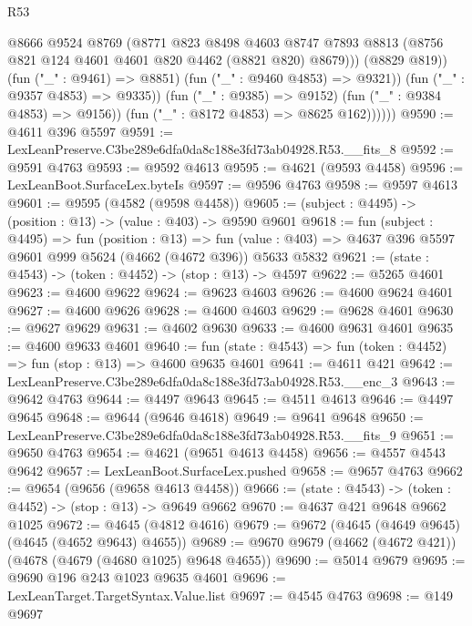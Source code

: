 \begin{lexlean}{R53}
\begin{coremodule}
                        @8666
                        @9524
                        @8769
                        (@8771
                          @823
                          @8498
                          @4603
                          @8747
                          @7893
                          @8813
                          (@8756 @821 @124 @4601 @4601 @820 @4462 (@8821 @820) @8679)))
                      (@8829 @819))
                    (fun ("_" : @9461) => @8851)
                    (fun ("_" : @9460 @4853) => @9321))
                  (fun ("_" : @9357 @4853) => @9335))
                (fun ("_" : @9385) => @9152)
                (fun ("_" : @9384 @4853) => @9156))
              (fun ("_" : @8172 @4853) => @8625 @162))))))
@9590 := @4611 @396 @5597
@9591 := LexLeanPreserve.C3be289e6dfa0da8c188e3fd73ab04928.R53.__fits_8
@9592 := @9591 @4763
@9593 := @9592 @4613
@9595 := @4621 (@9593 @4458)
@9596 := LexLeanBoot.SurfaceLex.byteIs
@9597 := @9596 @4763
@9598 := @9597 @4613
@9601 := @9595 (@4582 (@9598 @4458))
@9605 := (subject : @4495) -> (position : @13) -> (value : @403) -> @9590 @9601
@9618 := fun (subject : @4495) =>
  fun (position : @13) =>
  fun (value : @403) => @4637 @396 @5597 @9601 @999 @5624 (@4662 (@4672 @396)) @5633 @5832
@9621 := (state : @4543) -> (token : @4452) -> (stop : @13) -> @4597
@9622 := @5265 @4601
@9623 := @4600 @9622
@9624 := @9623 @4603
@9626 := @4600 @9624 @4601
@9627 := @4600 @9626
@9628 := @4600 @4603
@9629 := @9628 @4601
@9630 := @9627 @9629
@9631 := @4602 @9630
@9633 := @4600 @9631 @4601
@9635 := @4600 @9633 @4601
@9640 := fun (state : @4543) => fun (token : @4452) => fun (stop : @13) => @4600 @9635 @4601
@9641 := @4611 @421
@9642 := LexLeanPreserve.C3be289e6dfa0da8c188e3fd73ab04928.R53.__enc_3
@9643 := @9642 @4763
@9644 := @4497 @9643
@9645 := @4511 @4613
@9646 := @4497 @9645
@9648 := @9644 (@9646 @4618)
@9649 := @9641 @9648
@9650 := LexLeanPreserve.C3be289e6dfa0da8c188e3fd73ab04928.R53.__fits_9
@9651 := @9650 @4763
@9654 := @4621 (@9651 @4613 @4458)
@9656 := @4557 @4543 @9642
@9657 := LexLeanBoot.SurfaceLex.pushed
@9658 := @9657 @4763
@9662 := @9654 (@9656 (@9658 @4613 @4458))
@9666 := (state : @4543) -> (token : @4452) -> (stop : @13) -> @9649 @9662
@9670 := @4637 @421 @9648 @9662 @1025
@9672 := @4645 (@4812 @4616)
@9679 := @9672 (@4645 (@4649 @9645) (@4645 (@4652 @9643) @4655))
@9689 := @9670 @9679 (@4662 (@4672 @421)) (@4678 (@4679 (@4680 @1025) @9648 @4655))
@9690 := @5014 @9679
@9695 := @9690 @196 @243 @1023 @9635 @4601
@9696 := LexLeanTarget.TargetSyntax.Value.list
@9697 := @4545 @4763
@9698 := @149 @9697

\end{coremodule}
\end{lexlean}
